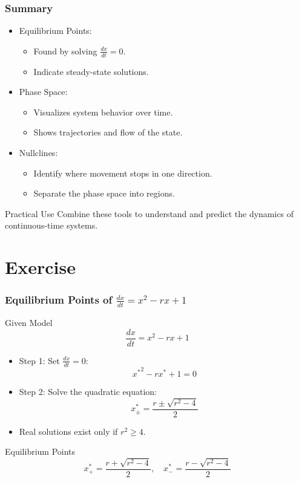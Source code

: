 \documentclass{beamer}
\begin{document}
\begin{frame}
\frametitle{Summary}

\begin{itemize}
    \item Equilibrium Points:
    \begin{itemize}
        \item Found by solving \(\frac{dx}{dt} = 0\).
        \item Indicate steady-state solutions.
    \end{itemize}
    \item Phase Space:
    \begin{itemize}
        \item Visualizes system behavior over time.
        \item Shows trajectories and flow of the state.
    \end{itemize}
    \item Nullclines:
    \begin{itemize}
        \item Identify where movement stops in one direction.
        \item Separate the phase space into regions.
    \end{itemize}
\end{itemize}

\begin{block}{Practical Use}
Combine these tools to understand and predict the dynamics of continuous-time systems.
\end{block}

\end{frame}

\section{Exercise}
\begin{frame}
\scriptsize
\frametitle{Equilibrium Points of \(\frac{dx}{dt} = x^2 - rx + 1\)}

\begin{block}{Given Model}
\[
\frac{dx}{dt} = x^2 - rx + 1
\]
\end{block}

\begin{itemize}
    \item Step 1: Set \(\frac{dx}{dt} = 0\):
    \[
    {x^*}^2 - rx^* + 1 = 0
    \]
    \item Step 2: Solve the quadratic equation:
    \[
    x^*_{\pm} = \frac{r \pm \sqrt{r^2 - 4}}{2}
    \]
    \item Real solutions exist only if \(r^2 \geq 4\).
\end{itemize}

\begin{block}{Equilibrium Points}
\[
x^*_+ = \frac{r + \sqrt{r^2 - 4}}{2}, \quad x^*_{-} = \frac{r - \sqrt{r^2 - 4}}{2}
\]
\end{block}

\end{frame}
\end{document}

